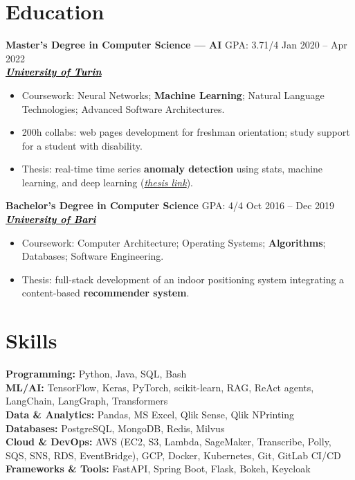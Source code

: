 \documentclass[11pt,a4paper]{article}
\let\OldHref\href
\renewcommand{\href}[2]{\OldHref{#1}{\textit{#2}}}
\begin{document}
	\section*{Education}
	{\small
		
		\textbf{Master’s Degree in Computer Science — AI} \hfill GPA: 3.71/4 \hspace{1em} Jan 2020 -- Apr 2022\\
		\hfill \href{https://www.unito.it/}{\textbf{\textcolor{black}{University of Turin}}}
		
		\begin{itemize}
			\item Coursework: Neural Networks; \textbf{Machine Learning}; Natural Language Technologies; Advanced Software Architectures.
			\item 200h collabs: web pages development for freshman orientation; study support for a student with disability.
			\item Thesis: real-time time series \textbf{anomaly detection} using stats, machine learning, and deep learning (\href{https://unitesi.unito.it/handle/20.500.14240/78909}{thesis link}).
		\end{itemize}
		
		\textbf{Bachelor’s Degree in Computer Science} \hfill GPA: 4/4 \hspace{2em} Oct 2016 -- Dec 2019\\
		\hfill \href{https://www.uniba.it/it}{\textbf{\textcolor{black}{University of Bari}}}
		
		\begin{itemize}
			\item Coursework: Computer Architecture; Operating Systems; \textbf{Algorithms}; Databases; Software Engineering.
			\item Thesis: full-stack development of an indoor positioning system integrating a content-based \textbf{recommender system}.
		\end{itemize}
	}
	
	\section*{Skills}
	{\small
		\textbf{Programming:} Python, Java, SQL, Bash \\
		\textbf{ML/AI:} TensorFlow, Keras, PyTorch, scikit-learn, RAG, ReAct agents, LangChain, LangGraph, Transformers \\
		\textbf{Data \& Analytics:} Pandas, MS Excel, Qlik Sense, Qlik NPrinting \\
		\textbf{Databases:} PostgreSQL, MongoDB, Redis, Milvus \\
		\textbf{Cloud \& DevOps:} AWS (EC2, S3, Lambda, SageMaker, Transcribe, Polly, SQS, SNS, RDS, EventBridge), GCP, Docker, Kubernetes, Git, GitLab CI/CD \\
		\textbf{Frameworks \& Tools:} FastAPI, Spring Boot, Flask, Bokeh, Keycloak
	}
	
\end{document}
